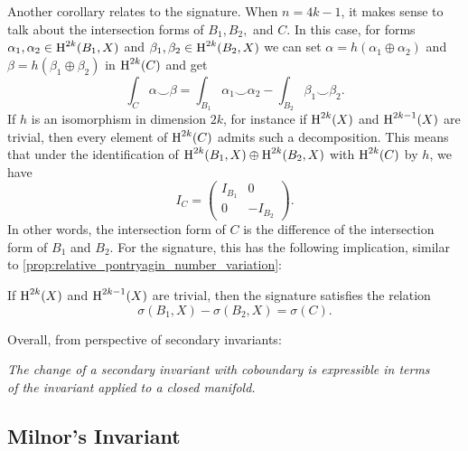 Another corollary relates to the signature. When $n=4k-1$, it makes sense to talk about the intersection forms of $B_1,B_2,$ and $C$. In this case, for forms $\alpha_1,\alpha_2\in \operatorname{H}^{2k}(B_1, X)$ and $\beta_1,\beta_2\in \operatorname{H}^{2k}(B_2,X)$ we can set $\alpha=h(\alpha_1\oplus\alpha_2)$ and $\beta=h(\beta_1\oplus \beta_2)$ in $\operatorname{H}^{2k}(C)$ and get
\[
	\int_{C} \alpha\smile \beta = \int_{B_1} \alpha_1\smile \alpha_2 - \int_{B_2}\beta_1\smile \beta_2.
\]
If $h$ is an isomorphism in dimension $2k$, for instance if $\operatorname{H}^{2k}(X)$ and $\operatorname{H}^{2k-1}(X)$ are trivial, then every element of $\operatorname{H}^{2k}(C)$ admits such a decomposition. This means that under the identification of $\operatorname{H}^{2k}(B_1,X)\oplus \operatorname{H}^{2k}(B_2,X)$ with $\operatorname{H}^{2k}(C)$ by $h$, we have
\[
	I_C = \begin{pmatrix}I_{B_1} & 0 \\ 0 & -I_{B_2}\end{pmatrix}.
\]
In other words, the intersection form of $C$ is the difference of the intersection form of $B_1$ and $B_2$. For the signature, this has the following implication, similar to \cref{prop:relative_pontryagin_number_variation}:
\begin{proposition}\label{prop:signature_variation}
	If $\operatorname{H}^{2k}(X)$ and $\operatorname{H}^{2k-1}(X)$ are trivial, then the signature satisfies the relation
	\begin{equation}\label{eq:signature_variation}
		\sigma(B_1, X) - \sigma(B_2, X) = \sigma(C).
	\end{equation}
\end{proposition}

Overall, from perspective of secondary invariants:
\begin{center}
	\textsl{The change of a secondary invariant with coboundary is expressible in terms}\\
	\textsl{of the invariant applied to a closed manifold.}
\end{center}


\subsection{Milnor's Invariant}

